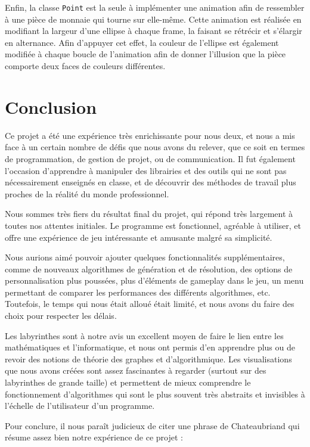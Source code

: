 \documentclass[12pt]{scrreprt} %
\begin{document}
Enfin, la classe \texttt{Point} est la seule à implémenter une animation afin de ressembler à une pièce de monnaie qui tourne sur elle-même. Cette animation est réalisée en modifiant la largeur d'une ellipse à chaque frame, la faisant se rétrécir et s'élargir en alternance. Afin d'appuyer cet effet, la couleur de l'ellipse est également modifiée à chaque boucle de l'animation afin de donner l'illusion que la pièce comporte deux faces de couleurs différentes.


\chapter*{Conclusion}

Ce projet a été une expérience très enrichissante pour nous deux, et nous a mis face à un certain nombre de défis que nous avons du relever, que ce soit en termes de programmation, de gestion de projet, ou de communication. Il fut également l'occasion d'apprendre à manipuler des librairies et des outils qui ne sont pas nécessairement enseignés en classe, et de découvrir des méthodes de travail plus proches de la réalité du monde professionnel.

Nous sommes très fiers du résultat final du projet, qui répond très largement à toutes nos attentes initiales. Le programme est fonctionnel, agréable à utiliser, et offre une expérience de jeu intéressante et amusante malgré sa simplicité.

Nous aurions aimé pouvoir ajouter quelques fonctionnalités supplémentaires, comme de nouveaux algorithmes de génération et de résolution, des options de personnalisation plus poussées, plus d'éléments de gameplay dans le jeu, un menu permettant de comparer les performances des différents algorithmes, etc. Toutefois, le temps qui nous était alloué était limité, et nous avons du faire des choix pour respecter les délais.

Les labyrinthes sont à notre avis un excellent moyen de faire le lien entre les mathématiques et l'informatique, et nous ont permis d'en apprendre plus ou de revoir des notions de théorie des graphes et d'algorithmique. Les visualisations que nous avons créées sont assez fascinantes à regarder (surtout sur des labyrinthes de grande taille) et permettent de mieux comprendre le fonctionnement d'algorithmes qui sont le plus souvent très abstraits et invisibles à l'échelle de l'utilisateur d'un programme.

Pour conclure, il nous paraît judicieux de citer une phrase de Chateaubriand qui résume assez bien notre expérience de ce projet :
\end{document}
